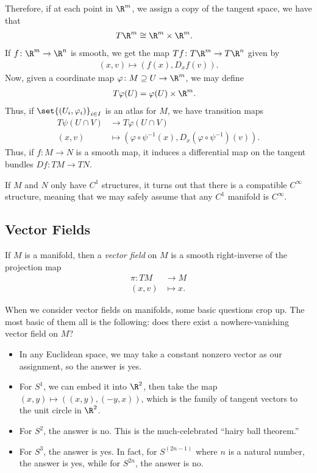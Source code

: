 \documentclass[10pt]{mypackage}
\begin{document}
Therefore, if at each point in $\R^{m}$, we assign a copy of the tangent space, we have that
\begin{align*}
  T\R^{m} &\cong \R^{m}\times \R^{m}.
\end{align*}
If $f\colon \R^{m}\rightarrow \R^{n}$ is smooth, we get the map $Tf\colon T\R^{m}\rightarrow T\R^{n}$ given by
\begin{align*}
  \left( x,v \right) \mapsto \left( f(x),D_xf(v) \right).
\end{align*}
Now, given a coordinate map $\varphi\colon M\supseteq U\rightarrow \R^{m}$, we may define
\begin{align*}
  T\varphi(U) &= \varphi(U)\times \R^{m}.
\end{align*}
Thus, if $\set{\left( U_i,\varphi_i \right)}_{i\in I}$ is an atlas for $M$, we have transition maps
\begin{align*}
  T\psi\left( U\cap V \right)&\rightarrow T\varphi\left( U\cap V \right)\\
  \left( x,v \right) &\mapsto \left( \varphi\circ\psi^{-1}\left( x \right),D_{x}\left( \varphi\circ\psi^{-1} \right)\left( v \right) \right).
\end{align*}
Thus, if $f\colon M\rightarrow N$ is a smooth map, it induces a differential map on the tangent bundles $Df\colon TM\rightarrow TN$.
\begin{remark}
  If $M$ and $N$ only have $C^1$ structures, it turns out that there is a compatible $C^{\infty}$ structure, meaning that we may safely assume that any $C^{1}$ manifold is $C^{\infty}$.
\end{remark}
\subsection{Vector Fields}%
\begin{definition}
  If $M$ is a manifold, then a \textit{vector field} on $M$ is a smooth right-inverse of the projection map
  \begin{align*}
    \pi\colon TM&\rightarrow M\\
    \left( x,v \right) &\mapsto x.
  \end{align*}
\end{definition}
When we consider vector fields on manifolds, some basic questions crop up. The most basic of them all is the following: does there exist a nowhere-vanishing vector field on $M$?
\begin{itemize}
  \item In any Euclidean space, we may take a constant nonzero vector as our assignment, so the answer is yes.
  \item For $S^{1}$, we can embed it into $\R^{2}$, then take the map $\left( x,y \right) \mapsto \left( \left( x,y \right),\left( -y,x \right) \right)$, which is the family of tangent vectors to the unit circle in $\R^{2}$.
  \item For $S^{2}$, the answer is no. This is the much-celebrated ``hairy ball theorem.''
  \item For $S^{3}$, the answer is yes. In fact, for $S^{(2n-1)}$ where $n$ is a natural number, the answer is yes, while for $S^{2n}$, the answer is no.
\end{itemize}
\end{document}
